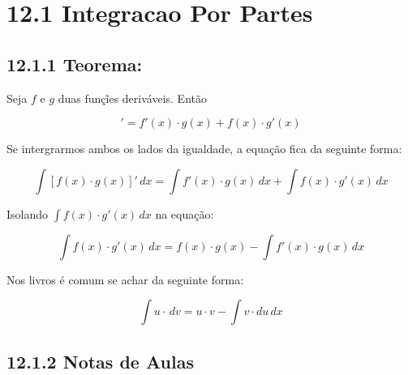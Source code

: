 \documentclass[article,12pt,oneside,a4paper,brazil]{abntex2}
\begin{document}
	\section*{12.1 Integracao Por Partes}
	
	\subsection*{12.1.1 Teorema: }
	
	\begin{flushleft}	
		Seja $f$ e $g$ duas funçĩes deriváveis. Então
		
		\begin{equation*}
			[f(x) \cdot g(x)]' = f'(x) \cdot g(x) + f(x) \cdot g'(x)
		\end{equation*}
		
		Se intergrarmos ambos os lados da igualdade, a equação fica da seguinte forma:
		
		\begin{equation*}
			\int [f(x) \cdot g(x)]' \,dx = \int f'(x) \cdot g(x) \,dx + \int f(x) \cdot g'(x) \,dx
		\end{equation*}
		
		Isolando $\int f(x) \cdot g'(x) \,dx$ na equação:
		
		\begin{equation*}
			\int f(x) \cdot g'(x) \,dx = f(x) \cdot g(x) - \int f'(x) \cdot g(x) \,dx
		\end{equation*}
	
		Nos livros é comum se achar da seguinte forma:
		
		\begin{equation*}
			\int u \cdot \,dv = u \cdot v- \int v \cdot du \,dx
		\end{equation*}
		
	\end{flushleft}
	
	\subsection*{12.1.2 Notas de Aulas}
	
\end{document}
